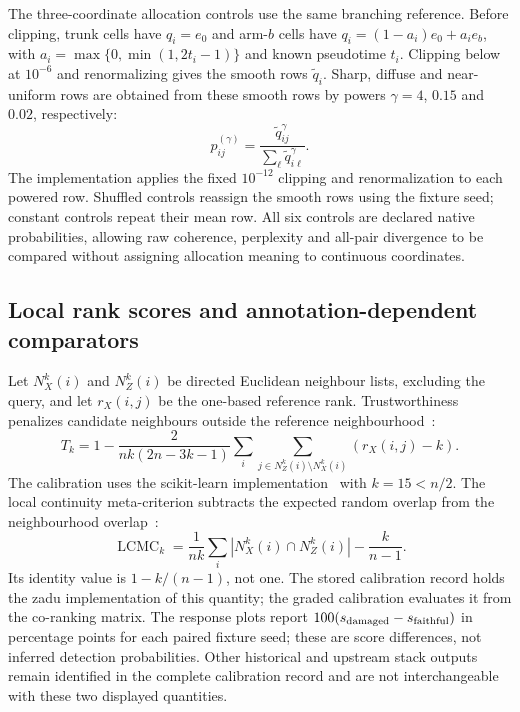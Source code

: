 \documentclass[11pt]{article}
\begin{document}
The three-coordinate allocation controls use the same branching reference. Before clipping, trunk cells have $q_i=e_0$ and arm-$b$ cells have $q_i=(1-a_i)e_0+a_ie_b$, with $a_i=\max\{0,\min(1,2t_i-1)\}$ and known pseudotime $t_i$. Clipping below at $10^{-6}$ and renormalizing gives the smooth rows $\widetilde q_i$. Sharp, diffuse and near-uniform rows are obtained from these smooth rows by powers $\gamma=4$, $0.15$ and $0.02$, respectively:
\begin{equation}
 p_{ij}^{(\gamma)}=\frac{\widetilde q_{ij}^{\gamma}}{\sum_\ell\widetilde q_{i\ell}^{\gamma}}.
\end{equation}
The implementation applies the fixed $10^{-12}$ clipping and renormalization to each powered row. Shuffled controls reassign the smooth rows using the fixture seed; constant controls repeat their mean row. All six controls are declared native probabilities, allowing raw coherence, perplexity and all-pair divergence to be compared without assigning allocation meaning to continuous coordinates.

\subsection{Local rank scores and annotation-dependent comparators}

Let $N_X^k(i)$ and $N_Z^k(i)$ be directed Euclidean neighbour lists, excluding the query, and let $r_X(i,j)$ be the one-based reference rank. Trustworthiness penalizes candidate neighbours outside the reference neighbourhood~\cite{venna2006local,venna2010retrieval}:
\begin{equation}
 T_k=1-\frac{2}{nk(2n-3k-1)}\sum_i\sum_{j\in N_Z^k(i)\setminus N_X^k(i)}(r_X(i,j)-k).
\end{equation}
The calibration uses the scikit-learn implementation~\cite{pedregosa2011scikit} with $k=15<n/2$. The local continuity meta-criterion subtracts the expected random overlap from the neighbourhood overlap~\cite{chen2009local,lee2009quality}:
\begin{equation}
 \operatorname{LCMC}_k=\frac{1}{nk}\sum_i|N_X^k(i)\cap N_Z^k(i)|-\frac{k}{n-1}.
\end{equation}
Its identity value is $1-k/(n-1)$, not one. The stored calibration record holds the zadu implementation of this quantity; the graded calibration evaluates it from the co-ranking matrix. The response plots report $100(s_{\rm damaged}-s_{\rm faithful})$ in percentage points for each paired fixture seed; these are score differences, not inferred detection probabilities. Other historical and upstream stack outputs remain identified in the complete calibration record and are not interchangeable with these two displayed quantities.
\end{document}
